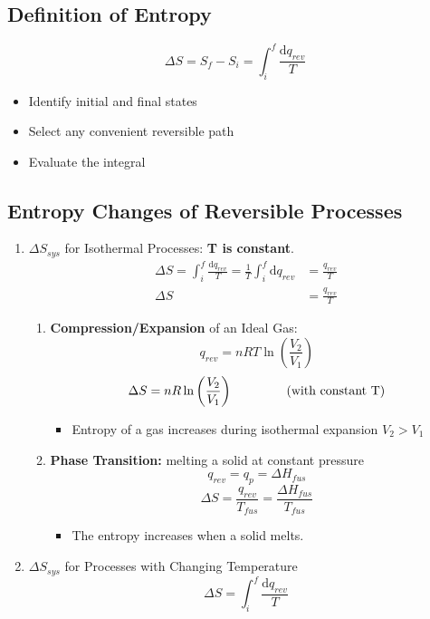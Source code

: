 \documentclass[10pt]{article}
\newcommand{\der}{\text{d}}
\begin{document}
\subsection*{Definition of Entropy}
\[\Delta S = S_f - S_i = \int_i^f \frac{\der q_{rev}}{T}\]
\begin{itemize}
    \item Identify initial and final states
    \item Select any convenient reversible path
    \item Evaluate the integral
\end{itemize}

\subsection*{Entropy Changes of Reversible Processes}
\begin{enumerate}
    \item $\Delta S_{sys}$ for Isothermal Processes: \textbf{T is constant}.
    \begin{align*}
        \Delta S = \int_i^f \frac{\der q_{rev}}{T} = \frac{1}{T} \int_i^f \der q_{rev} &= \frac{q_{rev}}{T}\\
        \Delta S &= \frac{q_{rev}}{T}
    \end{align*}
    \begin{enumerate}
        \item \textbf{Compression/Expansion} of an Ideal Gas:
        \[q_{rev} = nRT \ln \left(\frac{V_2}{V_1}\right)\]
        \[\Delta S = nR \ln \left(\frac{V_2}{V_1}\right)\hspace{1.5cm}\text{(with constant T)}\]
        \begin{itemize}
            \item Entropy of a gas increases during isothermal expansion $V_2 > V_1$
        \end{itemize}
        \item \textbf{Phase Transition:} melting a solid at constant pressure
        \[q_{rev} = q_p = \Delta H_{fus}\]
        \[\Delta S = \frac{q_{rev}}{T_{fus}} = \frac{\Delta H_{fus}}{T_{fus}}\]
        \begin{itemize}
            \item The entropy increases when a solid melts.
        \end{itemize}
    \end{enumerate}
    \item $\Delta S_{sys}$ for Processes with Changing Temperature
    \[\Delta S = \int_i^f \frac{\der q_{rev}}{T}\]

\end{enumerate}
\end{document}

